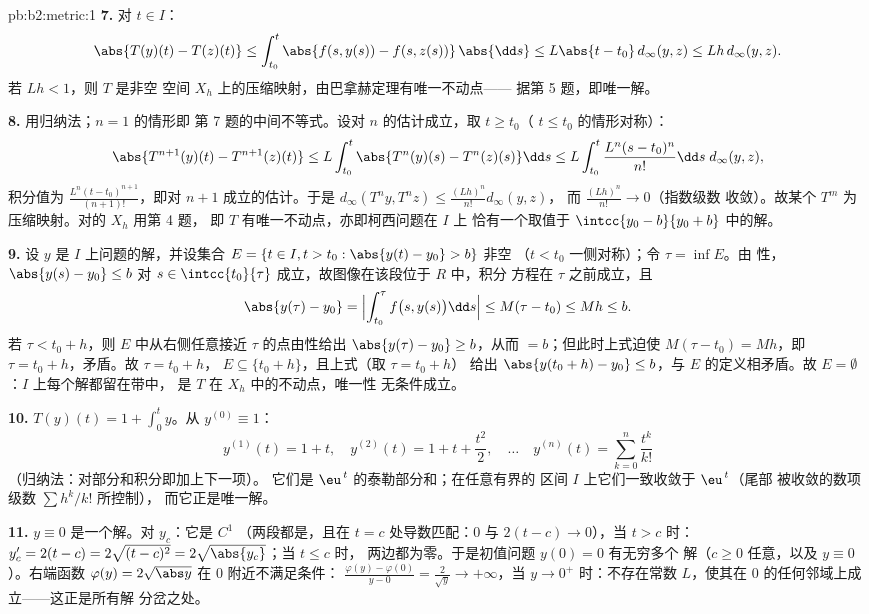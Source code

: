 \begin{solution}{pb:b2:metric:1}
\textbf{7.} 对 $t \in I$：
\[
\abs{T(y)(t) - T(z)(t)} \leq \int_{t_0}^{t}\abs{f(s, y(s)) -
f(s, z(s))}\,\abs{\dd s} \leq L\abs{t - t_0}\,d_\infty(y,z)
\leq Lh\,d_\infty(y,z).
\]
若 $Lh < 1$，则 $T$ 是非空
空间 $X_h$ 上的压缩映射，由巴拿赫定理有唯一不动点——
据第 5 题，即唯一解。

\textbf{8.} 用归纳法；$n = 1$ 的情形即
第 7 题的中间不等式。设对 $n$ 的估计成立，取 $t \geq t_0$（
$t \leq t_0$ 的情形对称）：
\[
\abs{T^{n+1}(y)(t) - T^{n+1}(z)(t)}
\leq L\int_{t_0}^{t}\abs{T^n(y)(s) - T^n(z)(s)}\dd s
\leq L\int_{t_0}^{t}\frac{L^n(s - t_0)^n}{n!}\dd s\;
d_\infty(y,z),
\]
积分值为 $\frac{L^n(t -
t_0)^{n+1}}{(n+1)!}$，即对 $n + 1$ 成立的估计。于是
$d_\infty(T^n y, T^n z) \leq \frac{(Lh)^n}{n!}d_\infty(y, z)$，
而 $\frac{(Lh)^n}{n!} \to 0$（指数级数
收敛）。故某个 $T^m$ 为压缩映射。对的 $X_h$ 用第 4 题，
即 $T$ 有唯一不动点，亦即柯西问题在 $I$ 上
恰有一个取值于
$\intcc{y_0 - b}{y_0 + b}$ 中的解。

\textbf{9.} 设 $y$ 是 $I$ 上问题的解，并设集合
$E = \{t \in I, t > t_0 : \abs{y(t) - y_0} > b\}$ 非空
（$t < t_0$ 一侧对称）；令 $\tau = \inf E$。由
性，$\abs{y(s) - y_0} \leq b$ 对 $s \in
\intcc{t_0}{\tau}$ 成立，故图像在该段位于 $R$ 中，积分
方程在 $\tau$ 之前成立，且
\[
\abs{y(\tau) - y_0} = \Bigl|\int_{t_0}^{\tau}f\bigl(s,
y(s)\bigr)\dd s\Bigr| \leq M(\tau - t_0) \leq Mh \leq b .
\]
若 $\tau < t_0 + h$，则 $E$ 中从右侧任意接近 $\tau$
的点由性给出 $\abs{y(\tau) - y_0} \geq
b$，从而 $= b$；但此时上式迫使 $M(\tau - t_0) =
Mh$，即 $\tau = t_0 + h$，矛盾。故 $\tau = t_0 + h$，
$E \subseteq \{t_0 + h\}$，且上式（取 $\tau = t_0 + h$）
给出 $\abs{y(t_0 + h) - y_0} \leq b$，与
$E$ 的定义相矛盾。故 $E = \emptyset$：$I$ 上每个解都留在带中，
是 $T$ 在 $X_h$ 中的不动点，唯一性
无条件成立。

\textbf{10.} $T(y)(t) = 1 + \int_0^t y$。从 $y^{(0)} \equiv
1$：
\[
y^{(1)}(t) = 1 + t,\quad
y^{(2)}(t) = 1 + t + \frac{t^2}2,\quad\dots\quad
y^{(n)}(t) = \sum_{k=0}^{n}\frac{t^k}{k!}
\]
（归纳法：对部分和积分即加上下一项）。
它们是 $\eu^{\,t}$ 的泰勒部分和；在任意有界的
区间 $I$ 上它们一致收敛于 $\eu^{\,t}$（尾部
被收敛的数项级数 $\sum h^k/k!$ 所控制），
而它正是唯一解。

\textbf{11.} $y \equiv 0$ 是一个解。对 $y_c$：它是 $C^1$
（两段都是，且在 $t = c$ 处导数匹配：$0$ 与
$2(t - c) \to 0$），当 $t > c$ 时：$y_c' = 2(t - c) =
2\sqrt{(t-c)^2} = 2\sqrt{\abs{y_c}}$；当 $t \leq c$ 时，
两边都为零。于是初值问题 $y(0) = 0$ 有无穷多个
解（$c \geq 0$ 任意，以及 $y \equiv 0$）。右端函数
$\varphi(y) = 2\sqrt{\abs y}$ 在 $0$ 附近不满足条件：
$\frac{\varphi(y) - \varphi(0)}{y - 0} = \frac{2}{\sqrt y} \to
+\infty$，当 $y \to 0^+$ 时：不存在常数 $L$，使其在
$0$ 的任何邻域上成立——这正是所有解
分岔之处。


\end{solution}
